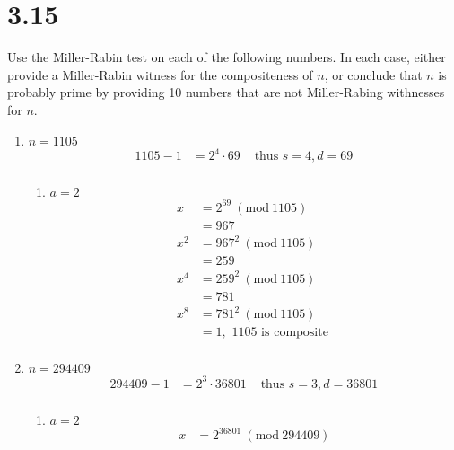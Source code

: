 \documentclass{article}
\newcommand{\Mod}[1]{\ (\mathrm{mod}\ #1)}
\begin{document}
\section*{3.15}
Use the Miller-Rabin test on each of the following numbers. In each case, either
provide a Miller-Rabin witness for the compositeness of \(n\), or conclude that
\(n\) is probably prime by providing 10 numbers that are not Miller-Rabing
withnesses for \(n\).
\begin{enumerate}[label=(\alph*)]
    \item \(n = 1105\)
          \begin{align*}
              1105 - 1 & = 2^4 \cdot 69 & \text{ thus } s = 4, d = 69 \\
          \end{align*}
          \begin{enumerate}[label=\arabic*.]
              \item
                    \(a = 2\)
                    \begin{align*}
                        x   & = 2^{69} \Mod{1105}             \\
                            & = 967                           \\
                        x^2 & = 967^2 \Mod{1105}              \\
                            & = 259                           \\
                        x^4 & = 259^2 \Mod{1105}              \\
                            & = 781                           \\
                        x^8 & = 781^2 \Mod{1105}              \\
                            & = 1, \text{ 1105 is composite } \\
                    \end{align*}
          \end{enumerate}
    \item \(n = 294409\)
          \begin{align*}
              294409 - 1 & = 2^3 \cdot 36801 & \text{ thus } s = 3, d = 36801 \\
          \end{align*}
          \begin{enumerate}[label=\arabic*.]
              \item \(a = 2\)
                    \begin{align*}
                        x   & = 2^{36801} \Mod{294409}          \\

\end{align*}
\end{enumerate}
\end{enumerate}
\end{document}
